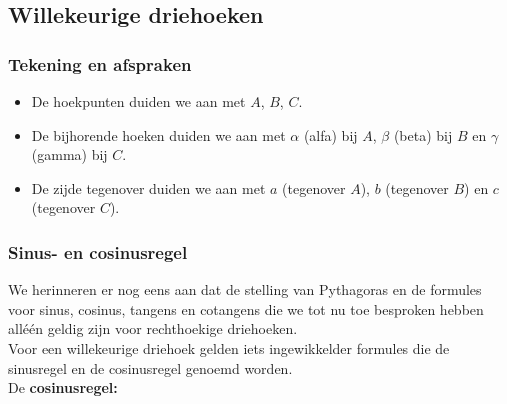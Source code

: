 \subsection{Willekeurige driehoeken}


\subsubsection{Tekening en afspraken}



\begin{itemize}
	\item De hoekpunten duiden we aan met $A$, $B$, $C$.
	\item De bijhorende hoeken duiden we aan met $\alpha$ (alfa) bij $A$, $\beta$ (beta) bij $B$ en $\gamma$ (gamma) bij $C$.
	\item De zijde tegenover duiden we aan met $a$ (tegenover $A$), $b$ (tegenover $B$) en $c$ (tegenover $C$).
\end{itemize}

\subsubsection{Sinus- en cosinusregel}

We herinneren er nog eens aan dat de stelling van Pythagoras en de formules voor sinus, cosinus, tangens en cotangens die we tot nu toe besproken hebben all\'{e}\'{e}n geldig zijn voor rechthoekige driehoeken.\\ Voor een willekeurige driehoek gelden iets ingewikkelder formules die de sinusregel en de cosinusregel genoemd worden.\\

De \textbf{cosinusregel:}

